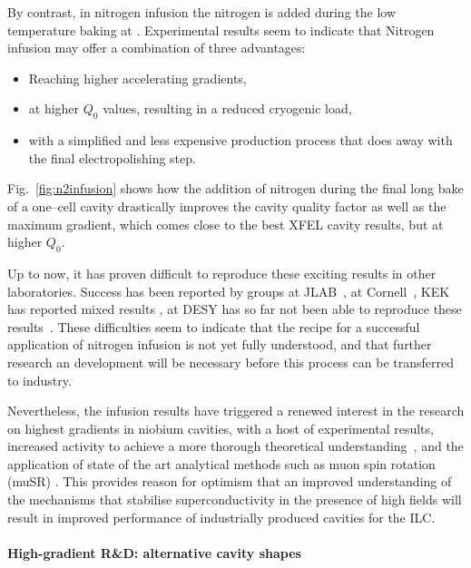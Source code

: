 By contrast, in nitrogen infusion the nitrogen is added during the low temperature baking at .
Experimental results seem to indicate that Nitrogen infusion may offer a combination of three advantages:
\begin{itemize}
\item Reaching higher accelerating gradients,
\item at higher $Q_0$ values, resulting in a reduced cryogenic load, 
\item with a simplified and less expensive production process that does away with the final electropolishing step.
\end{itemize}

Fig.~\ref{fig:n2infusion} \cite[Fig. 5]{Grassellino:2017bod} shows how the addition of nitrogen during the final  long  bake of a one--cell cavity drastically improves the cavity quality factor as well as the maximum gradient, which comes close to the best XFEL cavity results, but at higher $Q_0$.


Up to now, it has proven difficult to reproduce these exciting results in other laboratories.
Success has been reported by groups at JLAB~\cite{Dhakal:2017xxq}, at Cornell~\cite{Koufalis:2017blg}, KEK has reported mixed results \cite{bib:Umemori:2018.lcws}, at DESY has so far not been able to reproduce these results~\cite{Wenskat:2018zco}.
These difficulties seem to indicate that the recipe for a successful application of nitrogen infusion is not yet fully understood, and that further research an development will be necessary before this process can be transferred to industry. 

Nevertheless, the infusion results have triggered a renewed interest in the research on highest gradients in niobium cavities, with a host of experimental results, increased activity to achieve a more thorough theoretical understanding~\cite{Kubo:2017cww,Gurevich:2017vnn}, and the application of state of the art analytical methods such as   muon spin rotation (muSR) \cite{Romanenko:2013saa}.
This provides reason for optimism that an improved understanding of the mechanisms that stabilise superconductivity in the presence of high fields will result in improved performance of industrially produced cavities for the ILC.

\paragraph{High-gradient R\&D: alternative cavity shapes}

